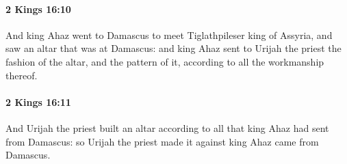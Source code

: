 		\paragraph{2 Kings 16:10} %
			\label{2KINGS-16-10}

			And king Ahaz went to Damascus to meet Tiglathpileser king of Assyria, and saw an altar that was at Damascus: and king Ahaz sent to Urijah the priest the fashion of the altar, and the pattern of it, according to all the workmanship thereof.


		\paragraph{2 Kings 16:11} %
			\label{2KINGS-16-11}

			And Urijah the priest built an altar according to all that king Ahaz had sent from Damascus: so Urijah the priest made it against king Ahaz came from Damascus.

